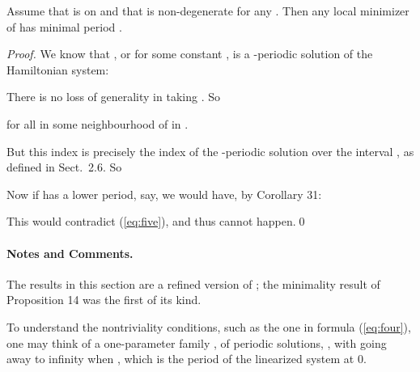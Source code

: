 \documentclass{llncs}
\begin{document}
\begin{lemma}
Assume that  is  on  and
that  is non-de\-gen\-er\-ate for any . Then any local
minimizer  of  has minimal period .
\end{lemma}
\begin{proof}
We know that , or
 for some constant , is a -periodic solution of the Hamiltonian system:


There is no loss of generality in taking . So

for all  in some neighbourhood of  in
.

But this index is precisely the index
 of the -periodic
solution  over the interval
, as defined in Sect.~2.6. So


Now if  has a lower period,  say,
we would have, by Corollary 31:


This would contradict (\ref{eq:five}), and thus cannot happen.\qed
\end{proof}
\paragraph{Notes and Comments.}
The results in this section are a
refined version of \cite{clar:eke};
the minimality result of Proposition
14 was the first of its kind.

To understand the nontriviality conditions, such as the one in formula
(\ref{eq:four}), one may think of a one-parameter family
, 
of periodic solutions, ,
with  going away to infinity when ,
which is the period of the linearized system at 0.
\end{document}
